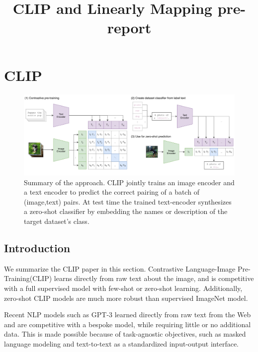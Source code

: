 \documentclass[extendedabs]{bmvc2k}
\begin{document}
\title{CLIP and Linearly Mapping pre-report}

 

\maketitle
\noindent

\section{CLIP}
\begin{figure}[t]
\centering
	\includegraphics[width=\linewidth]{images/fig1.PNG}
	\caption{
		Summary of the approach. CLIP jointly trains an image encoder and a text encoder to predict the correct pairing of a batch of (image,text) pairs. At test time the trained text-encoder synthesizes a zero-shot classifier by embedding the names or description of the target dataset's class.}
	\vspace{-2mm}
        \label{fig:clipapproach}
\end{figure}
\subsection{Introduction}
We summarize the CLIP paper\cite{clip} in this section. Contrastive Language-Image Pre-Training(CLIP) learns directly from raw text about the image, and is competitive with a full supervised model with few-shot or zero-shot learning. Additionally, zero-shot CLIP models are much more robust than supervised ImageNet model.

Recent NLP models such as GPT-3 learned directly from raw text from the Web and are competitive with a bespoke model, while requiring little or no additional data. This is made possible because of task-agnostic objectives, such as masked language modeling and text-to-text as a standardized input-output interface.
\end{document}

